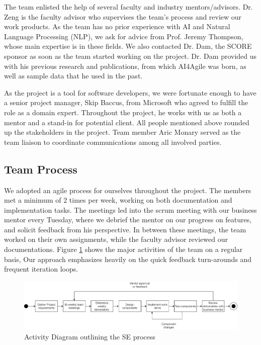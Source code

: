 The team enlisted the help of several faculty and industry mentors/advisors. Dr. Zeng is the faculty advisor who supervises the team's process and review our work products. As the team has no prior experience with AI and Natural Language Processing (NLP), we ask for advice from Prof. Jeremy Thompson, whose main expertise is in these fields. We also contacted Dr. Dam, the SCORE sponsor as soon as the team started working on the project. Dr. Dam provided us with his previous research and publications, from which AI4Agile was born, as well as sample data that he used in the past. 

As the project is a tool for software developers, we were fortunate enough to have a senior project manager, Skip Baccus, from Microsoft who agreed to fulfill the role as a domain expert. Throughout the project, he works with us as both a mentor and a stand-in for potential client. All people mentioned above rounded up the stakeholders in the project. Team member Aric Monary served as the team liaison to coordinate communications among all involved parties.

\subsection{Team Process}
We adopted an agile process for ourselves throughout the project. The members met a minimum of 2 times per week, working on both documentation and implementation tasks. The meetings led into the scrum meeting with our business mentor every Tuesday, where we debrief the mentor on our progress on features, and solicit feedback from his perspective. In between these meetings, the team worked on their own assignments, while the faculty advisor reviewed our documentations. Figure \ref{fig:acd} shows the major activities of the team on a regular basis, Our approach emphasizes heavily on the quick feedback turn-arounds and frequent iteration loops. 

\begin{figure}
\centering
\includegraphics[width=\textwidth,keepaspectratio]{./figure/ActivityDiagram.png}
\caption{Activity Diagram outlining the SE process}
\label{fig:acd}
\end{figure}

